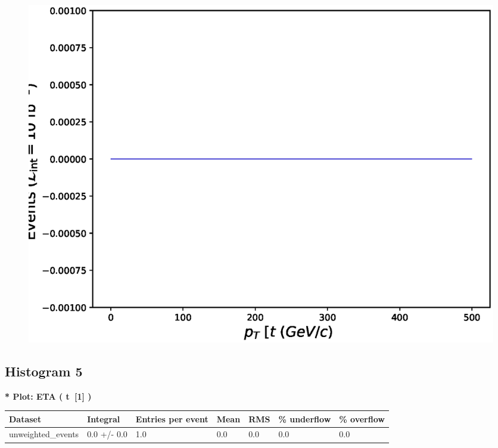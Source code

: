 \documentclass[a4paper, 10pt]{article}
\begin{document}
\begin{figure}[H]
  \begin{center}
    \includegraphics[scale=0.45]{selection_3.eps}\\
\caption{   }
  \end{center}
\end{figure}
      \newpage
\subsection{ Histogram 5}

\textbf{* Plot: ETA ( t~[1] ) }\\
   \begin{table}[H]
  \begin{center}
    \begin{tabular}{|m{23.0mm}|m{23.0mm}|m{18.0mm}|m{19.0mm}|m{19.0mm}|m{19.0mm}|m{19.0mm}|}
      \hline
      {\cellcolor{yellow}         Dataset}& {\cellcolor{yellow}         Integral}& {\cellcolor{yellow}         Entries per event}& {\cellcolor{yellow}         Mean}& {\cellcolor{yellow}         RMS}& {\cellcolor{yellow}         \% underflow}& {\cellcolor{yellow}         \% overflow}\\
      \hline
      {\cellcolor{white}         unweighted\_events}& {\cellcolor{white}         0.0 +/\-- 0.0}& {\cellcolor{white}         1.0}& {\cellcolor{white}         0.0}& {\cellcolor{white}         0.0}& {\cellcolor{green}         0.0}& {\cellcolor{green}         0.0}\\
\hline
    \end{tabular}
  \end{center}
\end{table}
\end{document}
